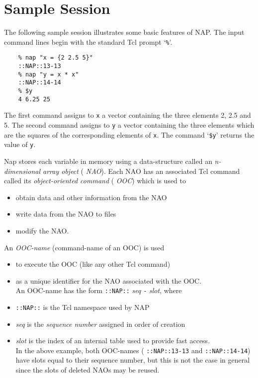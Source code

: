       \section{Sample Session}

    

The following sample session illustrates some basic features of
    NAP. The input command lines begin with the standard Tcl prompt
    `\texttt{\%}'.
    \begin{verbatim}
    % nap "x = {2 2.5 5}"
    ::NAP::13-13
    % nap "y = x * x"
    ::NAP::14-14
    % $y
    4 6.25 25
\end{verbatim}

    

The first command assigns to 
    \texttt{x} a vector containing the three elements 2, 2.5 and 5.
    The second command assigns to 
    \texttt{y} a vector containing the three elements which are the
    squares of the corresponding elements of 
    \texttt{x}. The command `\texttt{\$y}' returns the value of 
    \texttt{y}.
    

Nap stores each variable in memory using a data-structure called
    an 
    \emph{n-dimensional array object} (
    \emph{NAO}). Each NAO has an associated Tcl command called its 
    \emph{object-oriented command} (
    \emph{OOC}) which is used to
    \begin{itemize}
      \item obtain data and other information from the NAO
      \item write data from the NAO to files
      \item modify the NAO.
    \end{itemize}
    

An 
    \emph{OOC-name} (command-name of an OOC) is used
    \begin{itemize}
      \item to execute the OOC (like any other Tcl command)
      \item as a unique identifier for the NAO associated with the OOC.
      \\An OOC-name has the form 
      \texttt{::NAP::}
      \emph{seq}
      \texttt{-}
      \emph{slot}, where
      \item 
      \texttt{::NAP::} is the Tcl namespace used by NAP
      \item 
      \emph{seq} is the 
      \emph{sequence number} assigned in order of creation
      \item 
      \emph{slot} is the index of an internal table used to provide
      fast access.
      \\In the above example, both OOC-names (
      \texttt{::NAP::13-13} and 
      \texttt{::NAP::14-14}) have slots equal to their sequence
      number, but this is not the case in general since the slots of
      deleted NAOs may be reused.
    \end{itemize}
    

